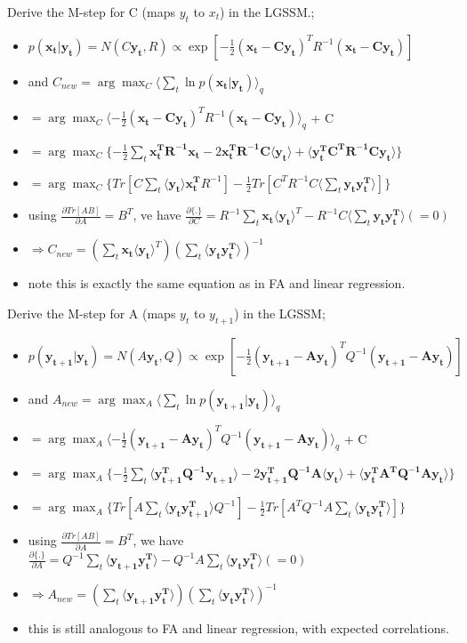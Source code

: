 \documentclass{article}
\begin{document}
Derive the M-step for C (maps $y_t$ to $x_t$) in the LGSSM.; \begin{itemize} \item $p(\mathbf{x_t|y_t}) = N(C\mathbf{y_t}, R) \propto \exp[-\frac{1}{2}(\mathbf{x_t - Cy_t})^T R^{-1}(\mathbf{x_t - Cy_t})]$ \item and $C_{new} = \arg\max_C \langle \sum_t \ln p(\mathbf{x_t|y_t}) \rangle_q$ \item $=\arg\max_C \langle -\frac{1}{2}(\mathbf{x_t - Cy_t})^T R^{-1}(\mathbf{x_t - Cy_t}) \rangle_q$ + C \item $=\arg\max_C \{ -\frac{1}{2}\sum_t\mathbf{x_t^TR^{-1}x_t} - 2\mathbf{x_t^TR^{-1}C\langle y_t}\rangle + \langle \mathbf{y_t^T C^T R^{-1} Cy_t} \rangle \}$ \item $=\arg\max_C \{ Tr[C\sum_t \langle \mathbf{y_t \rangle x_t^T}R^{-1}] -\frac{1}{2}Tr[C^TR^{-1}C\langle \sum_t \mathbf{y_ty_t^T} \rangle ] \}$ \item using $\frac{\partial Tr[AB]}{\partial A} = B^T$, ve have $\frac{\partial \{.\}}{\partial C} = R^{-1}\sum_t\mathbf{x_t\langle y_t} \rangle ^T - R^{-1}C\langle \sum_t \mathbf{y_ty_t^T}\rangle (=0)$ \item $\Rightarrow C_{new} = (\sum_t \mathbf{x_t \langle y_t} \rangle^T) (\sum_t \langle \mathbf{y_t y_t^T \rangle})^{-1}$ \item note this is exactly the same equation as in FA and linear regression. \end{itemize}

Derive the M-step for A (maps $y_t$ to $y_{t+1}$) in the LGSSM; \begin{itemize} \item $p(\mathbf{y_{t+1}|y_t}) = N(A\mathbf{y_t}, Q) \propto \exp[-\frac{1}{2}(\mathbf{y_{t+1} - Ay_t})^T Q^{-1}(\mathbf{y_{t+1} - Ay_t})]$ \item and $A_{new} = \arg\max_A \langle \sum_t \ln p(\mathbf{y_{t+1}|y_t}) \rangle_q$ \item $=\arg\max_A \langle -\frac{1}{2}(\mathbf{y_{t+1} - Ay_t})^T Q^{-1}(\mathbf{y_{t+1} - Ay_t}) \rangle_q$ + C \item $=\arg\max_A \{ -\frac{1}{2}\sum_t \langle \mathbf{y_{t+1}^TQ^{-1}y_{t+1}} \rangle - 2\mathbf{y_{t+1}^TQ^{-1}A\langle y_t}\rangle + \langle \mathbf{y_t^T A^T Q^{-1} Ay_t} \rangle \}$ \item $=\arg\max_A \{ Tr[A\sum_t \langle \mathbf{y_t y_{t+1}^T\rangle}Q^{-1}] -\frac{1}{2}Tr[A^TQ^{-1}A\sum_t\langle  \mathbf{y_ty_t^T} \rangle ] \}$ \item using $\frac{\partial Tr[AB]}{\partial A} = B^T$, we have $\frac{\partial \{.\}}{\partial A} = Q^{-1}\sum_t\langle\mathbf{y_{t+1} y_t^T} \rangle - Q^{-1}A\sum_t\langle \mathbf{y_ty_t^T}\rangle (=0)$ \item $\Rightarrow A_{new} = (\sum_t \langle \mathbf{y_{t+1} y_t^T} \rangle) (\sum_t \langle \mathbf{y_t y_t^T \rangle})^{-1}$ \item this is still analogous to FA and linear regression, with expected correlations. \end{itemize}
\end{document}
